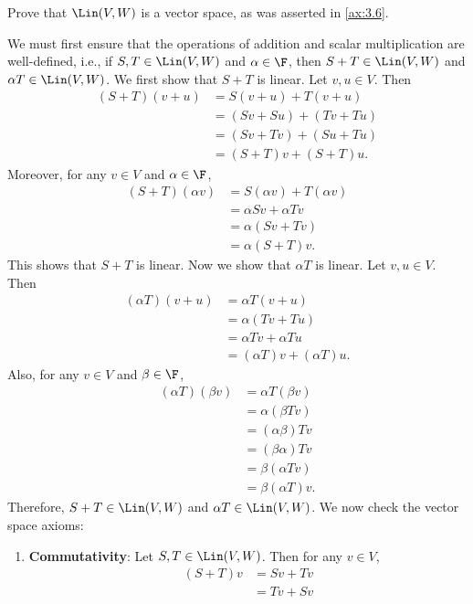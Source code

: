\begin{exc}
\begin{exercise}
Prove that $\Lin(V,W)$ is a vector space, as was asserted in \ref{ax:3.6}.
\end{exercise}
\begin{solution}
We must first ensure that the operations of addition and scalar
multiplication are well-defined, i.e., if $S,T\in\Lin(V,W)$ and
$\alpha\in\F$, then $S+T\in\Lin(V,W)$ and $\alpha T\in\Lin(V,W)$. We first
show that $S+T$ is linear. Let $v,u\in V$. Then
\begin{align*}
(S+T)(v+u) &= S(v+u)+T(v+u)\\
  &= (Sv+Su)+(Tv+Tu)\\
  &= (Sv+Tv)+(Su+Tu)\\
  &= (S+T)v+(S+T)u.
\end{align*}
Moreover, for any $v\in V$ and $\alpha\in\F$,
\begin{align*}
(S+T)(\alpha v) &= S(\alpha v)+T(\alpha v)\\
  &= \alpha Sv+\alpha Tv\\
  &= \alpha(Sv+Tv)\\
  &= \alpha(S+T)v.
\end{align*}
This shows that $S+T$ is linear. Now we show that $\alpha T$ is linear. Let
$v,u\in V$. Then
\begin{align*}
(\alpha T)(v+u) &= \alpha T(v+u)\\
  &= \alpha(Tv+Tu)\\
  &= \alpha Tv+\alpha Tu\\
  &= (\alpha T)v+(\alpha T)u.
\end{align*}
Also, for any $v\in V$ and $\beta\in\F$,
\begin{align*}
(\alpha T)(\beta v) &= \alpha T(\beta v)\\
  &= \alpha(\beta Tv)\\
  &= (\alpha\beta)Tv\\
  &= (\beta\alpha)Tv\\
  &= \beta(\alpha Tv)\\
  &= \beta(\alpha T)v.
\end{align*}
Therefore, $S+T\in\Lin(V,W)$ and $\alpha T\in\Lin(V,W)$. We now check the
vector space axioms:
\begin{enumerate}[label=\arabic*)]
\item \textbf{Commutativity}: Let $S,T\in\Lin(V,W)$. Then for any $v\in V$,
  \begin{align*}
  (S+T)v &= Sv+Tv\\
    &= Tv+Sv\\

\end{align*}
\end{enumerate}
\end{solution}
\end{exc}
